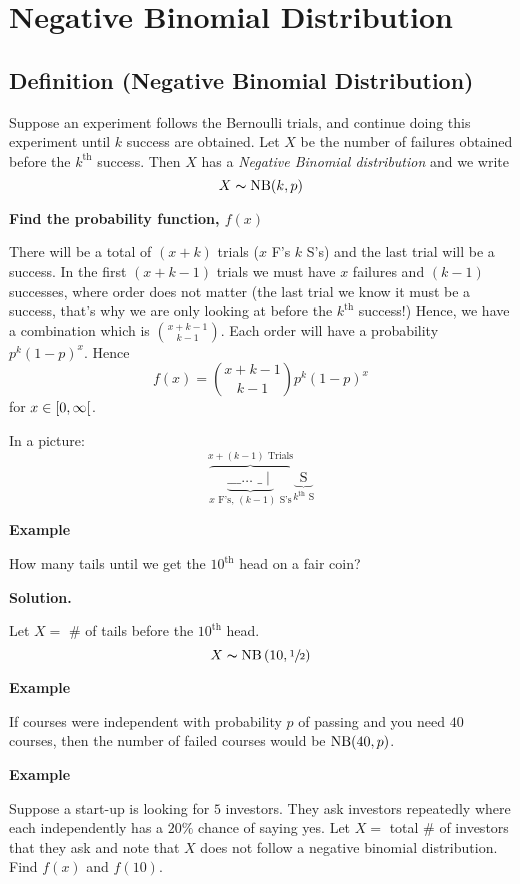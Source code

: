 
\section{Negative Binomial Distribution}
\begin{defbox}
    \subsection{Definition (Negative Binomial Distribution)}
    Suppose an experiment follows the Bernoulli trials, and continue
    doing this experiment until $ k $ success are obtained. Let $ X $
    be the number of failures obtained before the $ k^{\text{th}} $
    success. Then $ X $ has a \emph{Negative Binomial distribution}
    and we write
    \[ X \thicksim \operatorname{NB}(k,p) \]
\end{defbox}

\textbf{Find the probability function, $ f(x)$}

There will be a total of $ (x+k) $ trials ($ x $ F's $ k $ S's)
and the last trial will be a success. In the first $ (x+k-1) $ trials
we must have $ x $ failures and $ (k-1) $ successes, where order does not matter
(the last trial we know it must be a success, that's why we are only looking at
before the $ k^{\text{th}} $ success!)
Hence, we have a combination which is $ \binom{x+k-1}{k-1} $. Each order
will have a probability $ p^k(1-p)^x $. Hence
\[ f(x)=\binom{x+k-1}{k-1}p^k(1-p)^x \]
for $ x\in\rinterval{0}{\infty} $.

In a picture:
\[\overbrace{
        \underbrace{
            \text{\_ \_ \_ $\ldots$ \_}\mid}
        _{x \text{ F's},\,(k-1) \text{ S's}}}^{x+(k-1)\text{ Trials}}
    \underbrace{ \text{ S } }_{ k^{\text{th}} \text{ S}} \]

\textbf{Example}

How many tails until we get the $10^{\text{th}}$ head on a fair coin?

\textbf{Solution.}

Let $ X= $ \# of tails before the $ 10^{\text{th}} $ head.
\[ X\thicksim\operatorname{NB}\left(10,\sfrac{1}{2}\right) \]

\textbf{Example}

If courses were independent with probability $ p $ of passing
and you need $ 40 $ courses, then the number of failed courses
would be $ \operatorname{NB}(40,p) $.

\textbf{Example}

Suppose a start-up is looking for $ 5 $ investors. They ask
investors repeatedly where each independently has a $ 20\% $ chance
of saying yes. Let $ X= $ total \# of investors that they ask and
note that $ X $ does not follow a negative binomial distribution.
Find $ f(x) $ and $ f(10) $.

